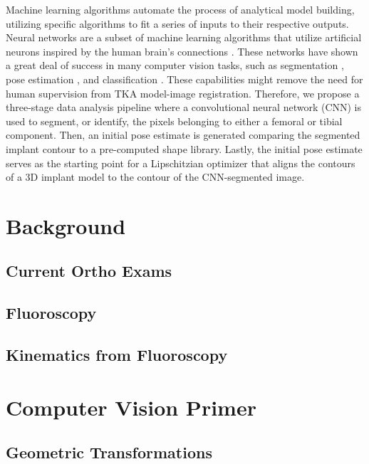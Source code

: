 Machine learning algorithms automate the process of analytical model building, utilizing specific algorithms to fit a series of inputs to their respective outputs. Neural networks are a subset of machine learning algorithms that utilize artificial neurons inspired by the human brain’s connections \cite{marrEarlyProcessingVisual1976}. These networks have shown a great deal of success in many computer vision tasks, such as segmentation \cite{chanHistoSegNetSemanticSegmentation2019,wangDeepHighResolutionRepresentation2020,ronnebergerUNetConvolutionalNetworks2015}, pose estimation \cite{wuDeepGraphPose2020,kendallGeometricLossFunctions2017}, and classification \cite{krizhevskyImageNetClassificationDeep2017,qiPointNetDeepHierarchical2017,qiPointNetDeepLearning2017}. These capabilities might remove the need for human supervision from TKA model-image registration. Therefore, we propose a three-stage data analysis pipeline where a convolutional neural network (CNN) is used to segment, or identify, the pixels belonging to either a femoral or tibial component. Then, an initial pose estimate is generated comparing the segmented implant contour to a pre-computed shape library. Lastly, the initial pose estimate serves as the starting point for a Lipschitzian optimizer that aligns the contours of a 3D implant model to the contour of the CNN-segmented image.

\section{Background}
\subsection{Current Ortho Exams}

\subsection{Fluoroscopy}

\subsection{Kinematics from Fluoroscopy}


\section{Computer Vision Primer}
\subsection{Geometric Transformations}

